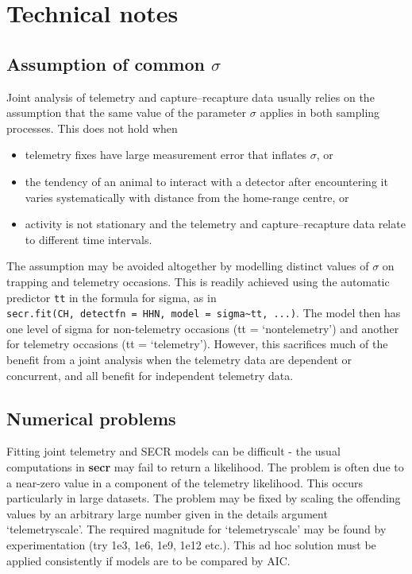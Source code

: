 \documentclass[
]{book}
\begin{document}
\section{Technical notes}\label{telemetrytechnotes}

\subsection{\texorpdfstring{Assumption of common \(\sigma\)}{Assumption of common \textbackslash sigma}}\label{assumption-of-common-sigma}

Joint analysis of telemetry and capture--recapture data usually relies on the assumption that the same value of the parameter \(\sigma\) applies in both sampling processes. This does not hold when

\begin{itemize}
\item
  telemetry fixes have large measurement error that inflates \(\sigma\), or
\item
  the tendency of an animal to interact with a detector after encountering it varies systematically with distance from the home-range centre, or
\item
  activity is not stationary and the telemetry and capture--recapture data relate to different time intervals.
\end{itemize}

The assumption may be avoided altogether by modelling distinct values of \(\sigma\) on trapping and telemetry occasions. This is readily achieved using the automatic predictor \texttt{tt} in the formula for sigma, as in \texttt{secr.fit(CH,\ detectfn\ =\ \textquotesingle{}HHN\textquotesingle{},\ model\ =\ sigma\textasciitilde{}tt,\ ...)}. The model then has one level of sigma for non-telemetry occasions (tt = `nontelemetry') and another for telemetry occasions (tt = `telemetry'). However, this sacrifices much of the benefit from a joint analysis when the telemetry data are dependent or concurrent, and all benefit for independent telemetry data.

\subsection{Numerical problems}\label{numerical-problems}

Fitting joint telemetry and SECR models can be difficult - the usual computations in \textbf{secr} may fail to return a likelihood. The problem is often due to a near-zero value in a component of the telemetry likelihood. This occurs particularly in large datasets. The problem may be fixed by scaling the offending values by an arbitrary large number given in the details argument `telemetryscale'. The required magnitude for `telemetryscale' may be found by experimentation (try 1e3, 1e6, 1e9, 1e12 etc.). This ad hoc solution must be applied consistently if models are to be compared by AIC.
\end{document}
